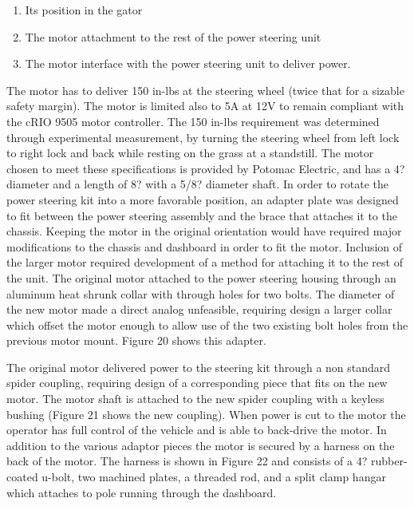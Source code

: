 \begin{enumerate}
\item Its position in the gator
\item The motor attachment to the rest of the power steering unit
\item The motor interface with the power steering unit to deliver power.
\end{enumerate}

\noindent The motor has to deliver 150 in-lbs at the steering wheel (twice that for a sizable safety margin). The motor is limited also to 5A at 12V to remain compliant with the cRIO 9505 motor controller. The 150 in-lbs requirement was determined through experimental measurement, by turning the steering wheel from left lock to right lock and back while resting on the grass at a standstill. The motor chosen to meet these specifications is provided by Potomac Electric, and has a 4? diameter and a length of 8? with a 5/8? diameter shaft. In order to rotate the power steering kit into a more favorable position, an adapter plate was designed to fit between the power steering assembly and the brace that attaches it to the chassis. Keeping the motor in the original orientation would have required major modifications to the chassis and dashboard in order to fit the motor. Inclusion of the larger motor required development of a method for attaching it to the rest of the unit. The original motor attached to the power steering housing through an aluminum heat shrunk collar with through holes for two bolts. The diameter of the new motor made a direct analog unfeasible, requiring design a larger collar which offset the motor enough to allow use of the two existing bolt holes from the previous motor mount. Figure 20 shows this adapter.

The original motor delivered power to the steering kit through a non standard spider coupling, requiring design of a corresponding piece that fits on the new motor. The motor shaft is attached to the new spider coupling with a keyless bushing (Figure 21 shows the new coupling). When power is cut to the motor the operator has full control of the vehicle and is able
to back-drive the motor. In addition to the various adaptor pieces the motor is secured by a harness on the back of the motor. The harness is shown in Figure 22 and consists of a 4? rubber-coated u-bolt, two machined plates, a threaded rod, and a split clamp hangar which attaches to pole running through the dashboard.



